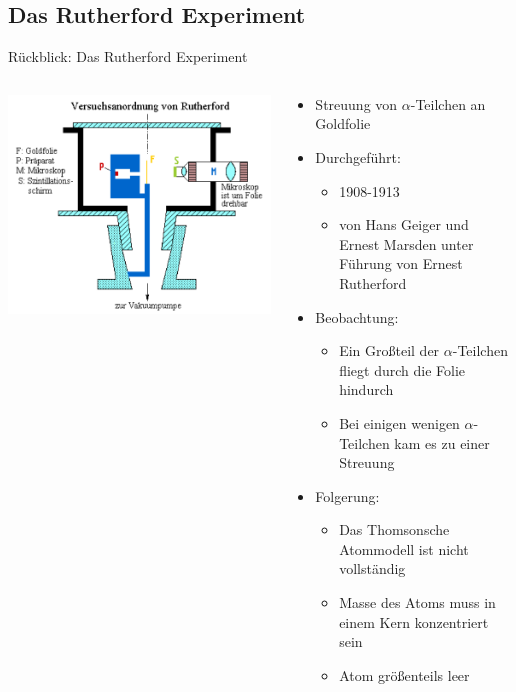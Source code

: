 \documentclass[aspectratio=1610, 9pt]{beamer}
\begin{document}
\subsection{Das Rutherford Experiment}
\begin{frame}{Rückblick: Das Rutherford Experiment}
  \begin{columns}
    \begin{column}{0.4\textwidth}
      \includegraphics[width=\textwidth]{images/Rutherford1.png}
    \end{column}
    \begin{column}{0.6\textwidth}
      \begin{itemize}
      \item{Streuung von $\alpha$-Teilchen an Goldfolie}
      \item{Durchgeführt: }
      \begin{itemize}
        \item{1908-1913}
        \item{von Hans Geiger und Ernest Marsden unter Führung von Ernest Rutherford}
      \end{itemize}
      \item{Beobachtung: }
      \begin{itemize}
        \item{Ein Großteil der $\alpha$-Teilchen fliegt durch die Folie hindurch}
        \item{Bei einigen wenigen $\alpha$-Teilchen kam es zu einer Streuung}
      \end{itemize}
      \item{Folgerung:}
      \begin{itemize}
        \item{Das Thomsonsche Atommodell ist nicht vollständig}
        \item{Masse des Atoms muss in einem Kern konzentriert sein}
        \item{Atom größenteils leer}
      \end{itemize}
      \end{itemize}
    \end{column}
  \end{columns}
\end{frame}
\end{document}
